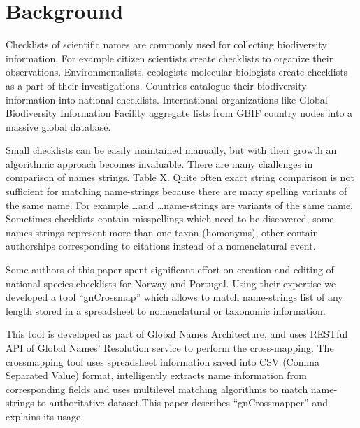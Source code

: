 \documentclass{bmcart}
\begin{document}
\newpage
\section*{Background}


  Checklists of scientific names are commonly used for collecting biodiversity
  information. For example citizen scientists create checklists to organize
  their observations. Environmentalists, ecologists molecular biologists create
  checklists as a part of their investigations. Countries catalogue their
  biodiversity information into national checklists. International
  organizations like Global Biodiversity Information Facility aggregate lists
  from GBIF country nodes into a massive global database.

  Small checklists can be easily maintained manually, but with their growth an
  algorithmic approach becomes invaluable. There are many challenges in
  comparison of names strings. Table X. Quite often exact string comparison is
  not sufficient for matching name-strings because there are many spelling
  variants of the same name. For example \ldots and \ldots name-strings are
  variants of the same name. Sometimes checklists contain misspellings which
  need to be discovered, some names-strings represent more than one taxon
  (homonyms), other contain authorships corresponding to citations instead of a
  nomenclatural event.

  Some authors of this paper spent significant effort on creation and editing
  of national species checklists for Norway and Portugal. Using their expertise
  we developed a tool ``gnCrossmap'' which allows to match name-strings list of
  any length stored in a spreadsheet to nomenclatural or taxonomic information.

  This tool is developed as part of Global Names Architecture, and uses RESTful
  API of Global Names' Resolution service to perform the cross-mapping. The
  crossmapping tool uses spreadsheet information saved into CSV (Comma
  Separated Value) format, intelligently extracts name information from
  corresponding fields and uses multilevel matching algorithms to match
  name-strings to authoritative dataset.This paper describes ``gnCrossmapper''
  and explains its usage.
\end{document}
